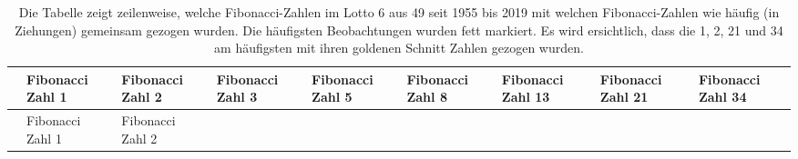 \documentclass[ngerman,]{article}
\begin{document}
\begin{longtable}[]{@{}lllllllll@{}}
\caption{Die Tabelle zeigt zeilenweise, welche Fibonacci-Zahlen im Lotto
6 aus 49 seit 1955 bis 2019 mit welchen Fibonacci-Zahlen wie häufig (in
Ziehungen) gemeinsam gezogen wurden. Die häufigsten Beobachtungen wurden
fett markiert. Es wird ersichtlich, dass die 1, 2, 21 und 34 am
häufigsten mit ihren goldenen Schnitt Zahlen gezogen
wurden.}\tabularnewline
\toprule
\begin{minipage}[b]{0.19\columnwidth}\raggedright\strut
\strut
\end{minipage} & \begin{minipage}[b]{0.07\columnwidth}\raggedright\strut
Fibonacci Zahl 1\strut
\end{minipage} & \begin{minipage}[b]{0.07\columnwidth}\raggedright\strut
Fibonacci Zahl 2\strut
\end{minipage} & \begin{minipage}[b]{0.07\columnwidth}\raggedright\strut
Fibonacci Zahl 3\strut
\end{minipage} & \begin{minipage}[b]{0.07\columnwidth}\raggedright\strut
Fibonacci Zahl 5\strut
\end{minipage} & \begin{minipage}[b]{0.07\columnwidth}\raggedright\strut
Fibonacci Zahl 8\strut
\end{minipage} & \begin{minipage}[b]{0.07\columnwidth}\raggedright\strut
Fibonacci Zahl 13\strut
\end{minipage} & \begin{minipage}[b]{0.07\columnwidth}\raggedright\strut
Fibonacci Zahl 21\strut
\end{minipage} & \begin{minipage}[b]{0.07\columnwidth}\raggedright\strut
Fibonacci Zahl 34\strut
\end{minipage}\tabularnewline
\midrule
\endfirsthead
\toprule
\begin{minipage}[b]{0.19\columnwidth}\raggedright\strut
\strut
\end{minipage} & \begin{minipage}[b]{0.07\columnwidth}\raggedright\strut
Fibonacci Zahl 1\strut
\end{minipage} & \begin{minipage}[b]{0.07\columnwidth}\raggedright\strut
Fibonacci Zahl 2\strut
\end{minipage} & \begin{minipage}[b]{0.07\columnwidth}\raggedright\strut

\end{minipage}
\end{longtable}
\end{document}
